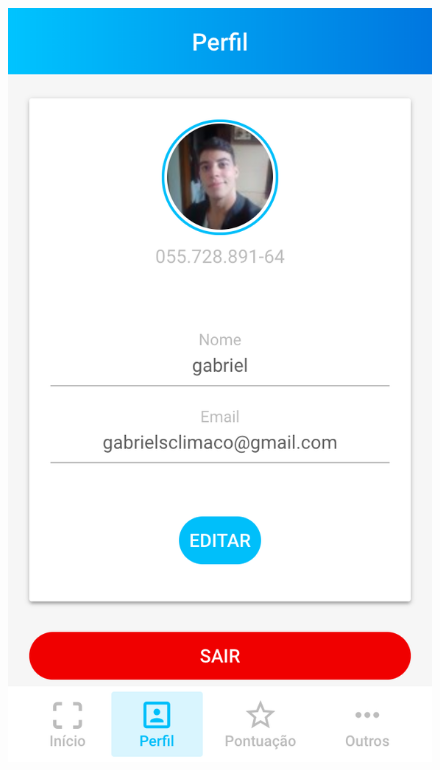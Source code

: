 \begin{figure}[!ht]
	\centering
		\includegraphics[scale=0.2]{figuras/software/profile.png}

\end{figure}
